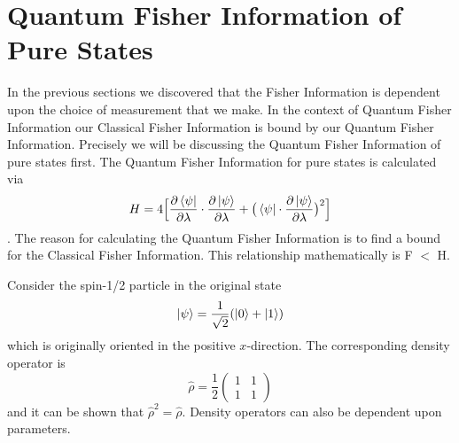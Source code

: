 \documentclass[twocolumn]{article}
\begin{document}
\section*{Quantum Fisher Information of Pure States}
In the previous sections we discovered that the Fisher Information is dependent upon the choice of measurement that we make. In the context of Quantum Fisher Information our Classical Fisher Information is bound by our Quantum Fisher Information. Precisely we will be discussing the Quantum Fisher Information of pure states first. The Quantum Fisher Information for pure states is calculated via
\begin{equation} \label{eq:62}
H=4\Big[\frac{\partial\bra{\psi}}{\partial\lambda}\cdot\frac{\partial\ket{\psi}}{\partial\lambda}+\big(\bra{\psi}\cdot\frac{\partial\ket{\psi}}{\partial\lambda}\big)^2\Big]
\end{equation}
\cite{D. Collins}. The reason for calculating the Quantum Fisher Information is to find a bound for the Classical Fisher Information. This relationship mathematically is F $<$ H. 

Consider the spin-1/2 particle in the original state
\begin{equation} \label{eq:63}
\ket{\psi}=\frac{1}{\sqrt{2}}(\ket{0}+\ket{1})
\end{equation}
which is originally oriented in the positive $x$-direction. The corresponding density operator is
\begin{equation} \label{eq:64}
\hat{\rho}=\frac{1}{2}
\begin{pmatrix}
1 & 1 \\
1 & 1
\end{pmatrix}
\end{equation}
and it can be shown that $\hat{\rho}^2=\hat{\rho}$. Density operators can also be dependent upon parameters.
\end{document}
